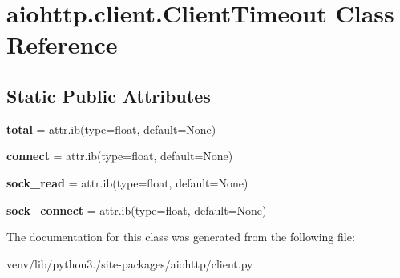\hypertarget{classaiohttp_1_1client_1_1_client_timeout}{}\section{aiohttp.\+client.\+Client\+Timeout Class Reference}
\label{classaiohttp_1_1client_1_1_client_timeout}
\subsection*{Static Public Attributes}
\begin{DoxyCompactItemize}
\item 
\mbox{\label{classaiohttp_1_1client_1_1_client_timeout_a283083073539d2e057f61a9613de150b}} 
{\bfseries total} = attr.\+ib(type=float, default=None)
\item 
\mbox{\label{classaiohttp_1_1client_1_1_client_timeout_a1fe264d2247cc62e032673beb662de48}} 
{\bfseries connect} = attr.\+ib(type=float, default=None)
\item 
\mbox{\label{classaiohttp_1_1client_1_1_client_timeout_abcde441f490c2a41c49ff007ba3a4bfe}} 
{\bfseries sock\+\_\+read} = attr.\+ib(type=float, default=None)
\item 
\mbox{\label{classaiohttp_1_1client_1_1_client_timeout_a59c4d494df6b4a0c2cf8a8830501076a}} 
{\bfseries sock\+\_\+connect} = attr.\+ib(type=float, default=None)
\end{DoxyCompactItemize}


The documentation for this class was generated from the following file\+:\begin{DoxyCompactItemize}
\item 
venv/lib/python3./site-\/packages/aiohttp/client.\+py\end{DoxyCompactItemize}
